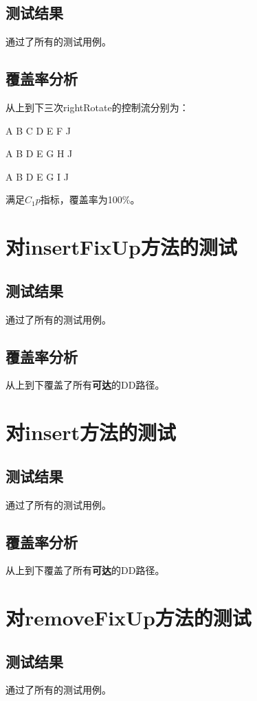 \documentclass[12pt, a4paper, oneside]{ctexart}
\begin{document}
\subsection{测试结果}
通过了所有的测试用例。

\subsection{覆盖率分析}
从上到下三次rightRotate的控制流分别为：

A B C D E F J

A B D E G H J

A B D E G I J

满足$C_1p$指标，覆盖率为100\%。

\section{对insertFixUp方法的测试}
\subsection{测试结果}
    通过了所有的测试用例。

\subsection{覆盖率分析}
    从上到下覆盖了所有\textbf{可达}的DD路径。

\section{对insert方法的测试}
\subsection{测试结果}
    通过了所有的测试用例。

\subsection{覆盖率分析}
    从上到下覆盖了所有\textbf{可达}的DD路径。

\section{对removeFixUp方法的测试}
\subsection{测试结果}
    通过了所有的测试用例。
\end{document}
